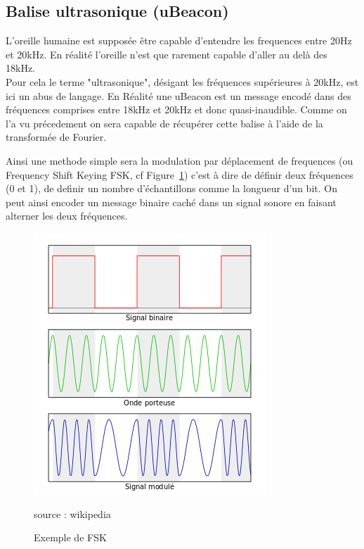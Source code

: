 \documentclass[12pt]{article}
\begin{document}

\subsection{Balise ultrasonique (uBeacon)}

L'oreille humaine est supposée être capable d'entendre les frequences entre 20Hz et 20kHz. En réalité l'oreille n'est que rarement capable d'aller au delà des 18kHz.\\
Pour cela le terme "ultrasonique", désigant les fréquences supérieures à 20kHz, est ici un abus de langage. En Réalité une uBeacon est un message encodé dans des fréquences comprises entre 18kHz et 20kHz et donc quasi-inaudible. Comme on l'a vu précedement on sera capable de récupérer cette balise à l'aide de la transformée de Fourier.

Ainsi une methode simple sera la modulation par déplacement de frequences (ou Frequency Shift Keying FSK, cf Figure~\ref{fig:fskExemple}) c'est à dire de définir deux fréquences (0 et 1), de definir un nombre d'échantillons comme la longueur d'un bit. On peut ainsi encoder un message binaire caché dans un signal sonore en faisant alterner les deux fréquences.

\begin{figure}[H]
\begin{center}
\caption{Exemple de FSK}
\label{fig:fskExemple}
\includegraphics[scale=0.75]{FSK.png}

\tiny{source : wikipedia}
\end{center}
\end{figure}
 
\end{document}
